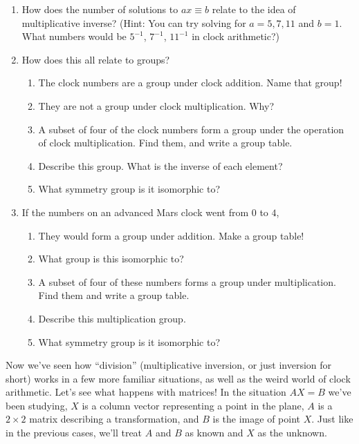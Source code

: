 \documentclass[../gatm.tex]{subfiles}
\begin{document}
\begin{enumerate}
\setcounter{enumi}{\value{problem_i}}
\item How does the number of solutions to $ax\equiv b$ relate to the idea of multiplicative inverse? (Hint: You can try solving for $a=5,7,11$ and $b=1$. What numbers would be $5^{-1}$, $7^{-1}$, $11^{-1}$ in clock arithmetic?)
\item How does this all relate to groups?
\begin{enumerate}
\item The clock numbers are a group under clock addition. Name that group!
\item They are not a group under clock multiplication. Why?
\item A subset of four of the clock numbers form a group under the operation of clock multiplication. Find them, and write a group table.
\item Describe this group. What is the inverse of each element?
\item What symmetry group is it isomorphic to?
\end{enumerate}
\item If the numbers on an advanced Mars clock went from $0$ to $4$,
\begin{enumerate}
\item They would form a group under addition. Make a group table!
\item What group is this isomorphic to?
\item A subset of four of these numbers forms a group under multiplication. Find them and write a group table.
\item Describe this multiplication group.
\item What symmetry group is it isomorphic to?
\end{enumerate}
\setcounter{problem_i}{\value{enumi}}
\end{enumerate}

\noindent Now we've seen how ``division'' (multiplicative inversion, or just inversion for short) works in a few more familiar situations, as well as the weird world of clock arithmetic. Let's see what happens with matrices! In the situation $AX=B$ we've been studying, $X$ is a column vector representing a point in the plane, $A$ is a $2\times 2$ matrix describing a transformation, and $B$ is the image of point $X$. Just like in the previous cases, we'll treat $A$ and $B$ as known and $X$ as the unknown.
\end{document}
